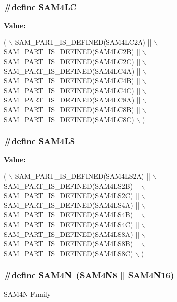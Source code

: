 \subsubsection[{S\+A\+M4\+L\+C}]{\setlength{\rightskip}{0pt plus 5cm}\#define S\+A\+M4\+L\+C}\label{group__sam__part__macros__group_gaff053c1dc2a1aaf1e97428da4cb49704}
{\bfseries Value\+:}
\begin{DoxyCode}
( \(\backslash\)
        SAM\_PART\_IS\_DEFINED(SAM4LC2A) || \(\backslash\)
        SAM\_PART\_IS\_DEFINED(SAM4LC2B) || \(\backslash\)
        SAM\_PART\_IS\_DEFINED(SAM4LC2C) || \(\backslash\)
        SAM\_PART\_IS\_DEFINED(SAM4LC4A) || \(\backslash\)
        SAM\_PART\_IS\_DEFINED(SAM4LC4B) || \(\backslash\)
        SAM\_PART\_IS\_DEFINED(SAM4LC4C) || \(\backslash\)
        SAM\_PART\_IS\_DEFINED(SAM4LC8A) || \(\backslash\)
        SAM\_PART\_IS\_DEFINED(SAM4LC8B) || \(\backslash\)
        SAM\_PART\_IS\_DEFINED(SAM4LC8C)    \(\backslash\)
        )
\end{DoxyCode}
\hypertarget{group__sam__part__macros__group_gafd288e34365d8a47cadf64f9040b97c6}{}
\subsubsection[{S\+A\+M4\+L\+S}]{\setlength{\rightskip}{0pt plus 5cm}\#define S\+A\+M4\+L\+S}\label{group__sam__part__macros__group_gafd288e34365d8a47cadf64f9040b97c6}
{\bfseries Value\+:}
\begin{DoxyCode}
( \(\backslash\)
        SAM\_PART\_IS\_DEFINED(SAM4LS2A) || \(\backslash\)
        SAM\_PART\_IS\_DEFINED(SAM4LS2B) || \(\backslash\)
        SAM\_PART\_IS\_DEFINED(SAM4LS2C) || \(\backslash\)
        SAM\_PART\_IS\_DEFINED(SAM4LS4A) || \(\backslash\)
        SAM\_PART\_IS\_DEFINED(SAM4LS4B) || \(\backslash\)
        SAM\_PART\_IS\_DEFINED(SAM4LS4C) || \(\backslash\)
        SAM\_PART\_IS\_DEFINED(SAM4LS8A) || \(\backslash\)
        SAM\_PART\_IS\_DEFINED(SAM4LS8B) || \(\backslash\)
        SAM\_PART\_IS\_DEFINED(SAM4LS8C)    \(\backslash\)
        )
\end{DoxyCode}
\hypertarget{group__sam__part__macros__group_gadb4c0138a71e1c2dfb0c91ad3ea5861c}{}
\subsubsection[{S\+A\+M4\+N}]{\setlength{\rightskip}{0pt plus 5cm}\#define S\+A\+M4\+N~(S\+A\+M4\+N8 $\vert$$\vert$ S\+A\+M4\+N16)}\label{group__sam__part__macros__group_gadb4c0138a71e1c2dfb0c91ad3ea5861c}
S\+A\+M4\+N Family \hypertarget{group__sam__part__macros__group_gad92bacc1b6c870d806f48e8195527911}{}

